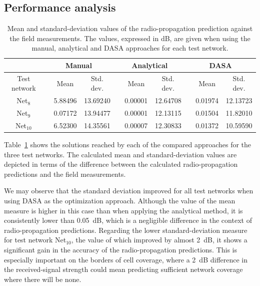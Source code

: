\subsection{Performance analysis}

{\small{}}
\begin{table}
\centering

\caption{Mean and standard-deviation values of the radio-propagation prediction
against the field measurements. The values, expressed in dB, are given
when using the manual, analytical and DASA approaches for each test
network. \label{tab:05-Solution_analysis}}


{\small{}}%
\begin{tabular}{cccccccccc}
\cline{2-10} 
 & \multicolumn{3}{c}{{\small{Manual}}} & \multicolumn{3}{c}{{\small{Analytical}}} & \multicolumn{3}{c}{{\small{DASA}}}\tabularnewline
\hline 
{\small{Test network}} &  & {\small{Mean}} & {\small{Std. dev.}} &  & {\small{Mean}} & {\small{Std. dev.}} &  & {\small{Mean}} & {\small{Std. dev.}}\tabularnewline
\hline 
{\small{Net$_{8}$}} &  & {\small{5.88496}} & {\small{13.69240}} &  & {\small{0.00001}} & {\small{12.64708}} &  & {\small{0.01974}} & {\small{12.13723}}\tabularnewline
{\small{Net$_{9}$}} &  & {\small{0.07172}} & {\small{13.94477}} &  & {\small{0.00001}} & {\small{12.13115}} &  & {\small{0.01504}} & {\small{11.82010}}\tabularnewline
{\small{Net$_{10}$}} &  & {\small{6.52300}} & {\small{14.35561}} &  & {\small{0.00007}} & {\small{12.30833}} &  & {\small{0.01372}} & {\small{10.59590}}\tabularnewline
\hline 
\end{tabular}
\end{table}
{\small \par}

Table~\ref{tab:05-Solution_analysis} shows the solutions reached
by each of the compared approaches for the three test networks. The
calculated mean and standard-deviation values are depicted in terms
of the difference between the calculated radio-propagation predictions
and the field measurements.

We may observe that the standard deviation improved for all test networks
when using DASA as the optimization approach. Although the value of
the mean measure is higher in this case than when applying the analytical
method, it is consistently lower than 0.05~dB, which is a negligible
difference in the context of radio-propagation predictions. Regarding
the lower standard-deviation measure for test network Net$_{10}$,
the value of which improved by almost 2~dB, it shows a significant
gain in the accuracy of the radio-propagation predictions. This is
especially important on the borders of cell coverage, where a 2~dB
difference in the received-signal strength could mean predicting sufficient
network coverage where there will be none.


